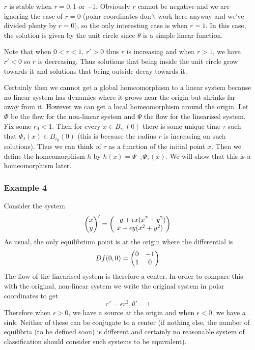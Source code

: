 $r$ is stable when $r = 0, 1$ or $-1$. Obviously $r$ cannot be negative and we are ignoring the case of $r = 0$ (polar coordinates don't work here anyway and we've divided plenty by $r = 0$), so the only interesting case is when $r = 1$. In this case, the solution is given by the unit circle since $\theta$ is a simple linear function.

Note that when $0 < r < 1$, $r' > 0$ thus $r$ is increasing and when $r > 1$, we have $r' < 0$ so $r$ is decreasing. Thus solutions that being inside the unit circle grow towards it and solutions that being outside decay towards it. 


Certainly then we cannot get a global homeomorphism to a linear system because no linear system has dynamics where it grows near the origin but shrinks far away from it. However we can get a local homeomorphism around the origin. Let $\Phi$ be the flow for the non-linear system and $\Psi$ the flow for the linearised system. Fix some $r_0  < 1$. Then for every $x \in B_{r_0}(0)$ there is some unique time $\tau$ such that $\Phi_t(x) \in B_{r_0}(0)$ (this is because the radius $r$ is increasing on such solutions). Thus we can think of $\tau$ as a function of the initial point $x$. Then we define the homeomorphism $h$ by $h(x) = \Psi_{-\tau}\Phi_{\tau}(x)$. We will show that this is a homeomorphism later.


\subsubsection{Example 4}
Consider the system
$$ \begin{pmatrix} x\\y \end{pmatrix}' = \begin{pmatrix} -y + \epsilon x(x^2 + y^2)\\x + \epsilon y(x^2 + y^2) \end{pmatrix} $$
As usual, the only equilibrium point is at the origin where the differential is
$$ Df(0, 0) = \begin{pmatrix} 0 & -1\\1 & 0 \end{pmatrix} $$
The flow of the linearised system is therefore a center. In order to compare this with the original, non-linear system we write the original system in polar coordinates to get
$$ r' = \epsilon r^3, \theta' = 1 $$
Therefore when $\epsilon > 0$, we have a source at the origin and when $\epsilon  < 0$, we have a sink. Neither of these can be conjugate to a center (if nothing else, the number of equilibria (to be defined soon) is different and certainly no reasonable system of classification should consider such systems to be equivalent). 

